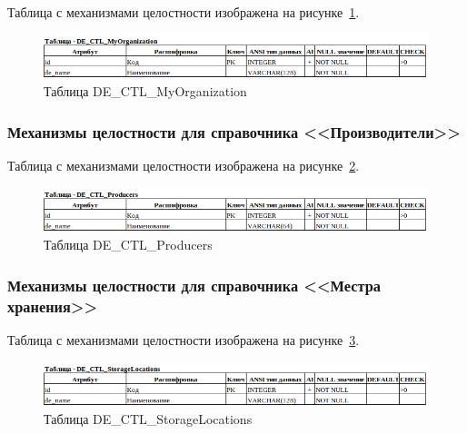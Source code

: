 Таблица с механизмами целостности изображена на рисунке~\ref{fig:Logic_DE_CTL_MyOrganization}.

\begin{figure}[!h]
    \centering

    \includegraphics[width=18cm]
    {assets/database/Types/DE_CTL_MyOrganization.png}

    \caption{Таблица DE\_CTL\_MyOrganization}

    \label{fig:Logic_DE_CTL_MyOrganization}
\end{figure}


\subsubsection{Механизмы целостности для справочника <<Производители>>}

Таблица с механизмами целостности изображена на рисунке~\ref{fig:Logic_DE_CTL_Producers}.

\begin{figure}[!h]
    \centering

    \includegraphics[width=18cm]
    {assets/database/Types/DE_CTL_Producers.png}

    \caption{Таблица DE\_CTL\_Producers}

    \label{fig:Logic_DE_CTL_Producers}
\end{figure}


\subsubsection{Механизмы целостности для справочника <<Местра хранения>>}

Таблица с механизмами целостности изображена на рисунке~\ref{fig:Logic_DE_CTL_StorageLocations}.

\begin{figure}[!h]
    \centering

    \includegraphics[width=18cm]
    {assets/database/Types/DE_CTL_StorageLocations.png}

    \caption{Таблица DE\_CTL\_StorageLocations}

    \label{fig:Logic_DE_CTL_StorageLocations}
\end{figure}

